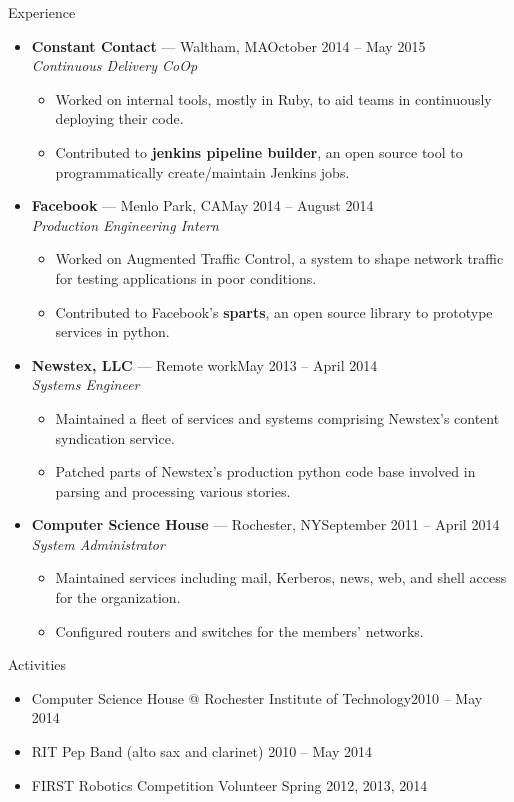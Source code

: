 \documentclass[10pt,oneside]{article}
\newenvironment{ressection}[1]{
	\vspace{3pt}
	{\fontfamily{ppl}\selectfont\Large#1}
	\begin{itemize}
	\vspace{2pt}
}{
	\end{itemize}
}
\newcommand{\resitem}[1]{
	\vspace{-2pt}
	\item \begin{flushleft} #1 \end{flushleft}
}
\newcommand{\ressubitem}[1]{
	\vspace{-1pt}
	\item \begin{flushleft} #1 \end{flushleft}
}
\newcommand{\resbigitem}[3]{
	\vspace{-3pt}
	\item
	\textbf{#1} --- #2 \\
	\textit{#3}
}
\newenvironment{ressubsec}[3]{
	\resbigitem{#1}{#2}{#3}
	\vspace{-1pt}
	\begin{itemize}
}{
	\end{itemize}
}
\begin{document}
\begin{ressection}{Experience}

	\begin{ressubsec}{Constant Contact}{Waltham, MA\hfill October 2014 -- May 2015}{Continuous Delivery CoOp}
		\ressubitem{Worked on internal tools, mostly in Ruby, to aid teams in continuously deploying their code.}
		\ressubitem{Contributed to \textbf{jenkins pipeline builder}, an open source tool to programmatically create/maintain Jenkins jobs.}
	\end{ressubsec}
	\begin{ressubsec}{Facebook}{Menlo Park, CA\hfill May 2014 -- August 2014}{Production Engineering Intern}
		\ressubitem{Worked on Augmented Traffic Control, a system to shape network traffic for testing applications in poor conditions.}
		\ressubitem{Contributed to Facebook's \textbf{sparts}, an open source library to prototype services in python.}
	\end{ressubsec}
	\begin{ressubsec}{Newstex, LLC}{Remote work\hfill May 2013 -- April 2014}{Systems Engineer}
		\ressubitem{Maintained a fleet of services and systems comprising Newstex's content syndication service.}
		\ressubitem{Patched parts of Newstex's production python code base involved in parsing and processing various stories.}
	\end{ressubsec}
	\begin{ressubsec}{Computer Science House}{Rochester, NY\hfill September 2011 -- April 2014}{System Administrator}
		\ressubitem{Maintained services including mail, Kerberos, news, web, and shell access for the organization.}
		\ressubitem{Configured routers and switches for the members' networks.}
	\end{ressubsec}

\end{ressection}


\begin{ressection}{Activities}

	\resitem{Computer Science House @ Rochester Institute of Technology\hfill 2010 -- May 2014}
	\resitem{RIT Pep Band (alto sax and clarinet) \hfill 2010 -- May 2014}
	\resitem{FIRST Robotics Competition Volunteer \hfill Spring 2012, 2013, 2014}

\end{ressection}
\end{document}
